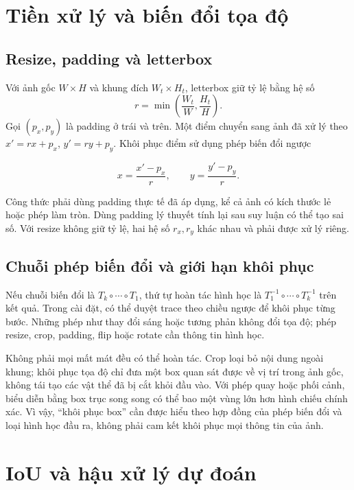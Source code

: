 \section{Tiền xử lý và biến đổi tọa độ}
\subsection{Resize, padding và letterbox}
Với ảnh gốc $W\times H$ và khung đích $W_t\times H_t$, letterbox giữ tỷ lệ bằng hệ số
\begin{equation}
r=\min\left(\frac{W_t}{W},\frac{H_t}{H}\right).
\end{equation}
Gọi $(p_x,p_y)$ là padding ở trái và trên. Một điểm chuyển sang ảnh đã xử lý theo $x'=rx+p_x$, $y'=ry+p_y$. Khôi phục điểm sử dụng phép biến đổi ngược
\begin{formulabox}[title={Khôi phục tọa độ sau letterbox}]
\begin{equation}
x=\frac{x'-p_x}{r},\qquad y=\frac{y'-p_y}{r}.
\end{equation}
\end{formulabox}
Công thức phải dùng padding thực tế đã áp dụng, kể cả ảnh có kích thước lẻ hoặc phép làm tròn. Dùng padding lý thuyết tính lại sau suy luận có thể tạo sai số. Với resize không giữ tỷ lệ, hai hệ số $r_x,r_y$ khác nhau và phải được xử lý riêng.

\subsection{Chuỗi phép biến đổi và giới hạn khôi phục}
Nếu chuỗi biến đổi là $T_k\circ\cdots\circ T_1$, thứ tự hoàn tác hình học là $T_1^{-1}\circ\cdots\circ T_k^{-1}$ trên kết quả. Trong cài đặt, có thể duyệt trace theo chiều ngược để khôi phục từng bước. Những phép như thay đổi sáng hoặc tương phản không đổi tọa độ; phép resize, crop, padding, flip hoặc rotate cần thông tin hình học.

Không phải mọi mất mát đều có thể hoàn tác. Crop loại bỏ nội dung ngoài khung; khôi phục tọa độ chỉ đưa một box quan sát được về vị trí trong ảnh gốc, không tái tạo các vật thể đã bị cắt khỏi đầu vào. Với phép quay hoặc phối cảnh, biểu diễn bằng box trục song song có thể bao một vùng lớn hơn hình chiếu chính xác. Vì vậy, ``khôi phục box'' cần được hiểu theo hợp đồng của phép biến đổi và loại hình học đầu ra, không phải cam kết khôi phục mọi thông tin của ảnh.

\section{IoU và hậu xử lý dự đoán}
